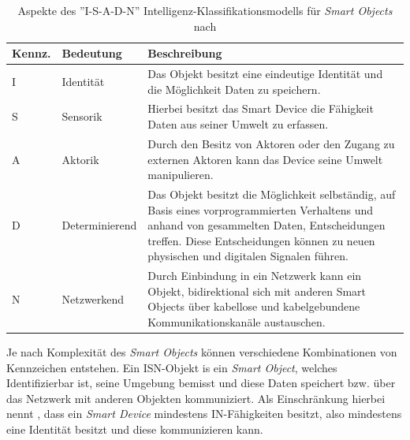 \begin{table}[H]
\centering
\begin{tabularx}{\textwidth}{llX}
\hline
\rowcolor[HTML]{EFEFEF} 
Kennz. & Bedeutung & Beschreibung \\ \hline
I      & Identität      & Das Objekt besitzt eine eindeutige Identität und die Möglichkeit Daten zu speichern. \\ \hline
S      & Sensorik       & Hierbei besitzt das Smart Device die Fähigkeit Daten aus seiner Umwelt zu erfassen. \\ \hline
A      & Aktorik        & Durch den Besitz von Aktoren oder den Zugang zu externen Aktoren kann das Device seine Umwelt manipulieren. \\ \hline
D      & Determinierend & Das Objekt besitzt die Möglichkeit selbständig, auf Basis eines vorprogrammierten Verhaltens und anhand von gesammelten Daten, Entscheidungen treffen. Diese Entscheidungen können zu neuen physischen und digitalen Signalen führen. \\ \hline
N      & Netzwerkend   & Durch Einbindung in ein Netzwerk kann ein Objekt, bidirektional sich mit anderen Smart Objects über kabellose und kabelgebundene Kommunikationskanäle austauschen. \\ \hline                                                        
\end{tabularx}
\caption{Aspekte des ''I-S-A-D-N'' Intelligenz-Klassifikationsmodells für \textit{Smart Objects} nach \cite{lopez2011taxonomy} }
\label{tab:isadnKennz}
\end{table}

Je nach Komplexität des \textit{Smart Objects} können verschiedene Kombinationen von Kennzeichen entstehen. Ein ISN-Objekt is ein \textit{Smart Object}, welches Identifizierbar ist, seine Umgebung bemisst und diese Daten speichert bzw. über das Netzwerk mit anderen Objekten kommuniziert. Als Einschränkung hierbei nennt \cite{lopez2011taxonomy}, dass ein \textit{Smart Device} mindestens IN-Fähigkeiten besitzt, also mindestens eine Identität besitzt und diese kommunizieren kann.

